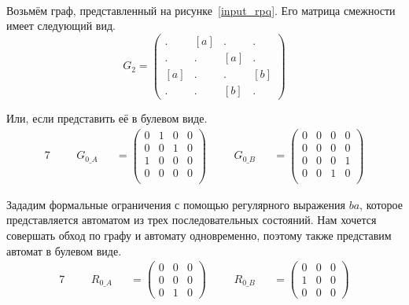 \begin{example}
  \begin{align}
    \label{input_rpq}
        
    \end{align}
  
  Возьмём граф, представленный на рисунке~\ref{input_rpq}.
  Его матрица смежности имеет следующий вид.
  \[ G_2 =
  \begin{pmatrix}
  . & [a] & . & . \\
  . & . & [a] & . \\
  [a] & . & . & [b] \\
  . & . & [b] & .
  \end{pmatrix}
  \]
  
  Или, если представить её в булевом виде.
  \begin{alignat*}{7}
  & &&G_{0\_A} &&= \begin{pmatrix}
  0 & 1       & 0 & 0       \\
  0 & 0 & 1       & 0 \\
  1  & 0 & 0 & 0       \\
  0       & 0 & 0 & 0 \\
  \end{pmatrix} \ \ \ \ &&G_{0\_B} &&= \begin{pmatrix}
  0 & 0       & 0 & 0       \\
  0       & 0 & 0       & 0 \\
  0  & 0 & 0 & 1       \\
  0       & 0 & 1 & 0 \\
  \end{pmatrix}
  \end{alignat*}

  Зададим формальные ограничения с помощью регулярного выражения $ba$, которое представляется автоматом из трех последовательных состояний.
  Нам хочется совершать обход по графу и автомату одновременно, поэтому также представим автомат в булевом виде.
  \begin{alignat*}{7}
    & &&R_{0\_A} &&= \begin{pmatrix}
      0 & 0 & 0 \\
      0 & 0 & 0 \\
      0 & 1 & 0 
      \end{pmatrix} \ \ \ \ &&R_{0\_B} &&= \begin{pmatrix}
        0 & 0 & 0 \\
        1 & 0 & 0 \\
        0 & 0 & 0 
        \end{pmatrix}
    \end{alignat*}


\end{example}
